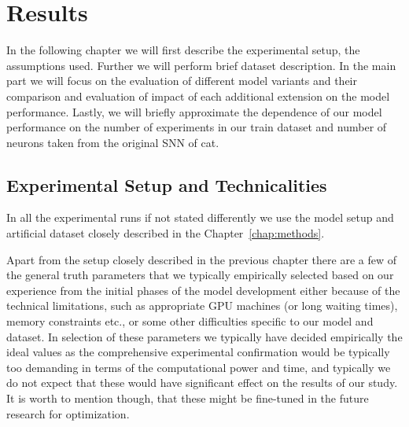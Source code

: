 \chapter{Results}
\label{chap:results}

In the following chapter we will first describe the experimental setup, the assumptions used. Further we will perform brief dataset description. In the main part we will focus on the evaluation of different model variants and their comparison and evaluation of impact of each additional extension on the model performance. Lastly, we will briefly approximate the dependence of our model performance on the number of experiments in our train dataset and number of neurons taken from the original SNN of cat.

\section{Experimental Setup and Technicalities}
\label{sec:experimental_setup}
In all the experimental runs if not stated differently we use the model setup and artificial dataset closely described in the Chapter~\ref{chap:methods}.

Apart from the setup closely described in the previous chapter there are a few of the general truth parameters that we typically empirically selected based on our experience from the initial phases of the model development either because of the technical limitations, such as appropriate GPU machines (or long waiting times), memory constraints etc., or some other difficulties specific to our model and dataset. In selection of these parameters we typically have decided empirically the ideal values as the comprehensive experimental confirmation would be typically too demanding in terms of the computational power and time, and typically we do not expect that these would have significant effect on the results of our study. It is worth to mention though, that these might be fine-tuned in the future research for optimization.

